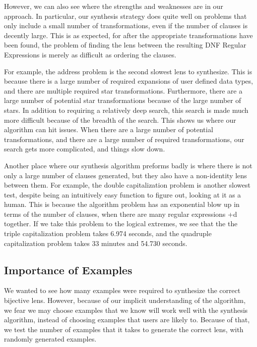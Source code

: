 However, we can also see where the strengths and weaknesses are in our approach.
In particular, our synthesis strategy does quite well on problems that only
include a small number of transformations, even if the number of clauses is
decently large.
This is as expected, for after the appropriate transformations have been found,
the problem of finding the lens between the resulting DNF Regular Expressions
is merely as difficult as ordering the clauses.

For example, the address problem is the second slowest lens to synthesize.
This is because there is a large number of required expansions of user defined
data types, and there are multiple required star transformations.
Furthermore, there are a large number of potential star transformations because
of the large number of stars.
In addition to requiring a relatively deep search, this search is made much
more difficult because of the breadth of the search.
This shows us where our algorithm can hit issues.
When there are a large number of potential transformations, and there are a
large number of required transformations, our search gets more complicated,
and things slow down.

Another place where our synthesis algorithm preforms badly is where there is not
only a large number of clauses generated, but they also have a non-identity
lens between them.
For example, the double capitalization problem is another slowest test, despite
being an intuitively easy function to figure out, looking at it as a human.
This is because the algorithm problem has an exponential blow up in terms
of the number of clauses, when there are many regular expressions +d together.
If we take this problem to the logical extremes, we see that the the triple
capitalization problem takes 6.974 seconds, and the quadruple capitalization
problem takes 33 minutes and 54.730 seconds.

\subsection{Importance of Examples}
We wanted to see how many examples were required to synthesize the correct
bijective lens.
However, because of our implicit understanding of the algorithm, we fear we may
choose examples that we know will work well with the synthesis algorithm,
instead of choosing examples that users are likely to.
Because of that, we test the number of examples that it takes to generate the
correct lens, with randomly generated examples.

